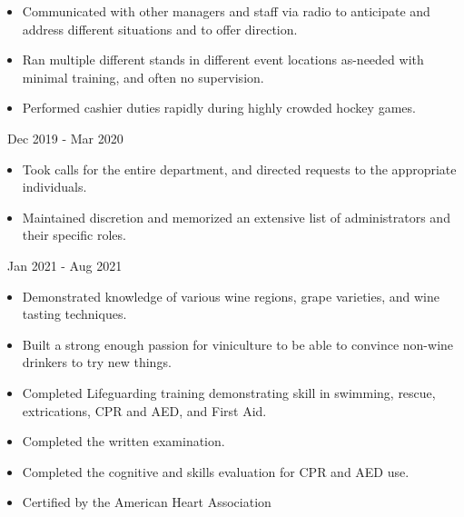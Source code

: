 \documentclass[11pt,letterpaper,ragged2e]{altacv}
\begin{document}
{
	\begin{itemize}
		\item{Communicated with other managers and staff via radio to anticipate and address different situations and to offer direction.}
		\item{Ran multiple different stands in different event locations as-needed with minimal training, and often no supervision.}
		\item{Performed cashier duties rapidly during highly crowded hockey games.}
	\end{itemize}
}
{\faCalendar\, Dec 2019 - Mar 2020}
{
}

{
	\begin{itemize}
		\item{Took calls for the entire department, and directed requests to the appropriate individuals.}
		\item{Maintained discretion and memorized an extensive list of administrators and their specific roles.}
	\end{itemize}
}
{\faCalendar\, Jan 2021 - Aug 2021}
{
}



{
	\begin{itemize}
		\item{Demonstrated knowledge of various wine regions, grape varieties, and wine tasting techniques.}
		\item{Built a strong enough passion for viniculture to be able to convince non-wine drinkers to try new things.}
	\end{itemize}
}
{
}

{
	\begin{itemize}
		\item{Completed Lifeguarding training demonstrating skill in swimming, rescue, extrications, CPR and AED, and  First Aid.}
		\item{Completed the written examination.}
	\end{itemize}
}
{
}

{
	\begin{itemize}
		\item{Completed the cognitive and skills evaluation for CPR and AED use.}
		\item{Certified by the American Heart Association}
	\end{itemize}
}
{
}


\clearpage

\nocite{*}
\end{document}
